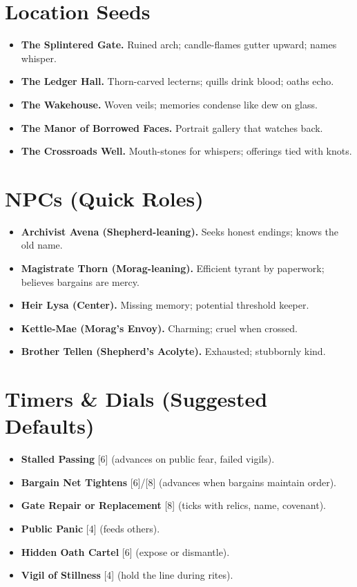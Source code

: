 \documentclass[11pt]{article}
\newcommand{\timer}[1]{\textsc{[#1]}}
\begin{document}
\section*{Location Seeds}
\begin{itemize}
  \item \textbf{The Splintered Gate.} Ruined arch; candle-flames gutter upward; names whisper.
  \item \textbf{The Ledger Hall.} Thorn-carved lecterns; quills drink blood; oaths echo.
  \item \textbf{The Wakehouse.} Woven veils; memories condense like dew on glass.
  \item \textbf{The Manor of Borrowed Faces.} Portrait gallery that watches back.
  \item \textbf{The Crossroads Well.} Mouth-stones for whispers; offerings tied with knots.
\end{itemize}

\section*{NPCs (Quick Roles)}
\begin{itemize}
  \item \textbf{Archivist Avena (Shepherd-leaning).} Seeks honest endings; knows the old name.
  \item \textbf{Magistrate Thorn (Morag-leaning).} Efficient tyrant by paperwork; believes bargains are mercy.
  \item \textbf{Heir Lysa (Center).} Missing memory; potential threshold keeper.
  \item \textbf{Kettle-Mae (Morag's Envoy).} Charming; cruel when crossed.
  \item \textbf{Brother Tellen (Shepherd's Acolyte).} Exhausted; stubbornly kind.
\end{itemize}

\section*{Timers \& Dials (Suggested Defaults)}
\begin{itemize}
  \item \textbf{Stalled Passing} \timer{6} (advances on public fear, failed vigils).
  \item \textbf{Bargain Net Tightens} \timer{6}/\timer{8} (advances when bargains maintain order).
  \item \textbf{Gate Repair or Replacement} \timer{8} (ticks with relics, name, covenant).
  \item \textbf{Public Panic} \timer{4} (feeds others).
  \item \textbf{Hidden Oath Cartel} \timer{6} (expose or dismantle).
  \item \textbf{Vigil of Stillness} \timer{4} (hold the line during rites).
\end{itemize}
\end{document}
